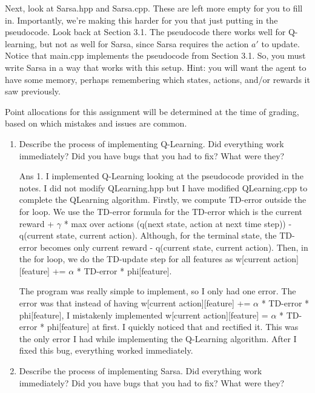 \documentclass[]{article}
\begin{document}
Next, look at Sarsa.hpp and Sarsa.cpp. These are left more empty for you to fill in. Importantly, we're making this harder for you that just putting in the pseudocode. Look back at Section 3.1. The pseudocode there works well for Q-learning, but not as well for Sarsa, since Sarsa requires the action $a'$ to update. Notice that main.cpp implements the pseudocode from Section 3.1. So, you must write Sarsa in a way that works with this setup. Hint: you will want the agent to have some memory, perhaps remembering which states, actions, and/or rewards it saw previously.

Point allocations for this assignment will be determined at the time of grading, based on which mistakes and issues are common.

\begin{enumerate}
    \item Describe the process of implementing Q-Learning. Did everything work immediately? Did you have bugs that you had to fix? What were they?

	{
		\color{blue}
		Ans 1. I implemented Q-Learning looking at the pseudocode provided in the notes. I did not modify QLearning.hpp but I have modified QLearning.cpp to complete the QLearning algorithm. Firstly, we compute TD-error outside the for loop. We use the TD-error formula for the TD-error which is the current reward + $\gamma$ * max over actions (q(next state, action at next time step)) - q(current state, current action). Although, for the terminal state, the TD-error becomes only current reward - q(current state, current action). Then, in the for loop, we do the TD-update step for all features as w[current action][feature] += $\alpha$ * TD-error * phi[feature].

The program was really simple to implement, so I only had one error. The error was that instead of having w[current action][feature] += $\alpha$ * TD-error * phi[feature], I mistakenly implemented w[current action][feature] = $\alpha$ * TD-error * phi[feature] at first. I quickly noticed that and rectified it. This was the only error I had while implementing the Q-Learning algorithm. After I fixed this bug, everything worked immediately.

	}

    \item Describe the process of implementing Sarsa. Did everything work immediately? Did you have bugs that you had to fix? What were they?


\end{enumerate}
\end{document}
